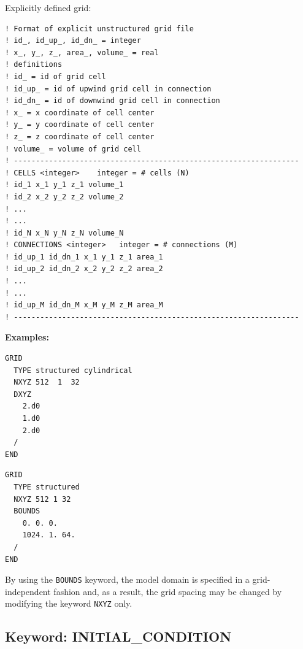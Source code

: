 \begin{mdframed}

Explicitly defined grid:

\footnotesize
\begin{verbatim}
! Format of explicit unstructured grid file
! id_, id_up_, id_dn_ = integer
! x_, y_, z_, area_, volume_ = real
! definitions
! id_ = id of grid cell
! id_up_ = id of upwind grid cell in connection
! id_dn_ = id of downwind grid cell in connection
! x_ = x coordinate of cell center
! y_ = y coordinate of cell center
! z_ = z coordinate of cell center
! volume_ = volume of grid cell
! -----------------------------------------------------------------
! CELLS <integer>    integer = # cells (N)
! id_1 x_1 y_1 z_1 volume_1
! id_2 x_2 y_2 z_2 volume_2
! ...
! ...
! id_N x_N y_N z_N volume_N
! CONNECTIONS <integer>   integer = # connections (M)
! id_up_1 id_dn_1 x_1 y_1 z_1 area_1
! id_up_2 id_dn_2 x_2 y_2 z_2 area_2
! ...
! ...
! id_up_M id_dn_M x_M y_M z_M area_M
! -----------------------------------------------------------------
\end{verbatim}
\normalsize
\end{mdframed}

\begin{mdframed}

\noindent
{\bf Examples:}
\footnotesize
\begin{verbatim}
GRID
  TYPE structured cylindrical
  NXYZ 512  1  32
  DXYZ
    2.d0
    1.d0
    2.d0
  /
END
\end{verbatim}

\begin{verbatim}
GRID
  TYPE structured
  NXYZ 512 1 32
  BOUNDS
    0. 0. 0.
    1024. 1. 64.
  /
END
\end{verbatim}
\normalsize
\end{mdframed}

\noindent
By using the {\tt BOUNDS} keyword, the model domain is specified in a grid-independent fashion and, as a result, the grid spacing may be changed by modifying the keyword {\tt NXYZ} only.

\hyperlink{target_key}{\return}

\hyperlink{target_input_file}{\returnb}


\newpage
\protect\hypertarget{target_init}{}

\subsection{Keyword: INITIAL\_CONDITION}

